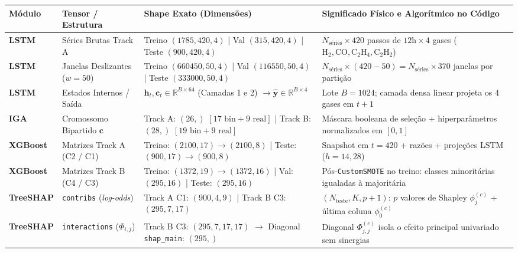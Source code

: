 \documentclass[10pt,a4paper]{article}
\begin{document}
\begin{table}[H]
\centering\footnotesize
\renewcommand{\arraystretch}{1.12}
\begin{tabularx}{\textwidth}{l l l X}
\toprule
\textbf{Módulo} & \textbf{Tensor / Estrutura} & \textbf{Shape Exato (Dimensões)} & \textbf{Significado Físico e Algorítmico no Código} \\
\midrule
\textbf{LSTM} & Séries Brutas Track A & Treino $(1785, 420, 4)$ | Val $(315, 420, 4)$ | Teste $(900, 420, 4)$ & $N_{\text{séries}} \times 420$ passos de $12\text{h} \times 4$ gases ($\text{H}_2, \text{CO}, \text{C}_2\text{H}_4, \text{C}_2\text{H}_2$) \\
\textbf{LSTM} & Janelas Deslizantes ($w=50$) & Treino $(660450, 50, 4)$ | Val $(116550, 50, 4)$ | Teste $(333000, 50, 4)$ & $N_{\text{séries}} \times (420 - 50) = N_{\text{séries}} \times 370$ janelas por partição \\
\textbf{LSTM} & Estados Internos / Saída & $\mathbf{h}_t, \mathbf{c}_t \in \mathbb{R}^{B \times 64}$ (Camadas 1 e 2) $\to \hat{\mathbf{y}} \in \mathbb{R}^{B \times 4}$ & Lote $B=1024$; camada densa linear projeta os 4 gases em $t+1$ \\
\textbf{IGA} & Cromossomo Bipartido $\mathbf{c}$ & Track A: $(26,)$ $[17\text{ bin} + 9\text{ real}]$ | Track B: $(28,)$ $[19\text{ bin} + 9\text{ real}]$ & Máscara booleana de seleção + hiperparâmetros normalizados em $[0,1]$ \\
\textbf{XGBoost} & Matrizes Track A (C2 / C1) & Treino: $(2100, 17) \to (2100, 8)$ | Teste: $(900, 17) \to (900, 8)$ & Snapshot em $t=420$ + razões + projeções LSTM ($h=14, 28$) \\
\textbf{XGBoost} & Matrizes Track B (C4 / C3) & Treino: $(1372, 19) \to (1372, 16)$ | Val: $(295, 16)$ | Teste: $(295, 16)$ & Pós-\texttt{CustomSMOTE} no treino: classes minoritárias igualadas à majoritária \\
\textbf{TreeSHAP} & \texttt{contribs} (\textit{log-odds}) & Track A C1: $(900, 4, 9)$ | Track B C3: $(295, 7, 17)$ & $(N_{\text{teste}}, K, p+1)$: $p$ valores de Shapley $\phi_j^{(c)}$ + última coluna $\phi_0^{(c)}$ \\
\textbf{TreeSHAP} & \texttt{interactions} ($\Phi_{i, j}$) & Track B C3: $(295, 7, 17, 17)$ $\to$ Diagonal \texttt{shap\_main}: $(295,)$ & Diagonal $\Phi_{j,j}^{(c)}$ isola o efeito principal univariado sem sinergias \\
\bottomrule
\end{tabularx}
\end{table}
\end{document}
